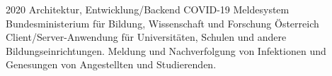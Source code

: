 \cventry
{2020}
{Architektur, Entwicklung/Backend}
{COVID-19 Meldesystem}
{Bundesministerium für Bildung, Wissenschaft und Forschung}
{Österreich}
{
  Client/Server-Anwendung für Universitäten, Schulen und andere
  Bildungseinrichtungen. Meldung und Nachverfolgung von Infektionen
  und Genesungen von Angestellten und Studierenden.
}
